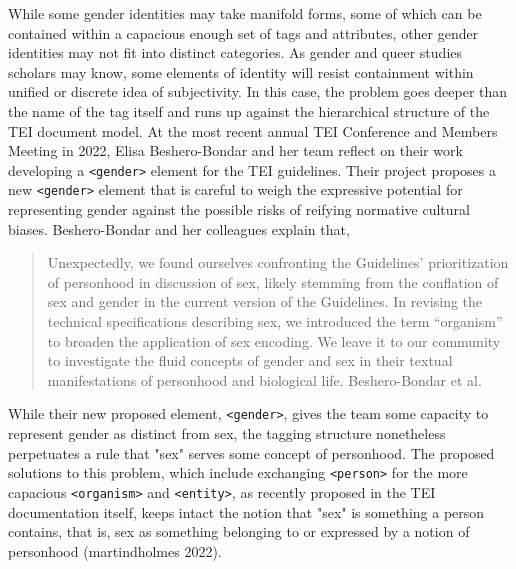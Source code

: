 \documentclass[11pt]{article}
\begin{document}
While some gender identities may take manifold forms, some of which
can be contained within a capacious enough set of tags and attributes,
other gender identities may not fit into distinct categories. As
gender and queer studies scholars may know, some elements of identity
will resist containment within unified or discrete idea of
subjectivity. In this case, the problem goes deeper than the name of
the tag itself and runs up against the hierarchical structure of the
TEI document model. At the most recent annual TEI Conference and
Members Meeting in 2022, Elisa Beshero-Bondar and her team reflect on
their work developing a \texttt{<gender>} element for the TEI
guidelines. Their project proposes a new \texttt{<gender>} element that is
careful to weigh the expressive potential for representing gender
against the possible risks of reifying normative cultural
biases. Beshero-Bondar and her colleagues explain that,
\begin{quote}
Unexpectedly, we found ourselves confronting the Guidelines’
prioritization of personhood in discussion of sex, likely stemming
from the conflation of sex and gender in the current version of the
Guidelines. In revising the technical specifications describing sex,
we introduced the term “organism” to broaden the application of sex
encoding. We leave it to our community to investigate the fluid
concepts of gender and sex in their textual manifestations of
personhood and biological life. Beshero-Bondar et al.
\end{quote}
While their new proposed element, \texttt{<gender>}, gives the team some
capacity to represent gender as distinct from sex, the tagging
structure nonetheless perpetuates a rule that "sex" serves some
concept of personhood. The proposed solutions to this problem, which
include exchanging \texttt{<person>} for the more capacious \texttt{<organism>} and
\texttt{<entity>}, as recently proposed in the TEI documentation itself,
keeps intact the notion that "sex" is something a person contains,
that is, sex as something belonging to or expressed by a notion of
personhood (martindholmes 2022).
\end{document}
